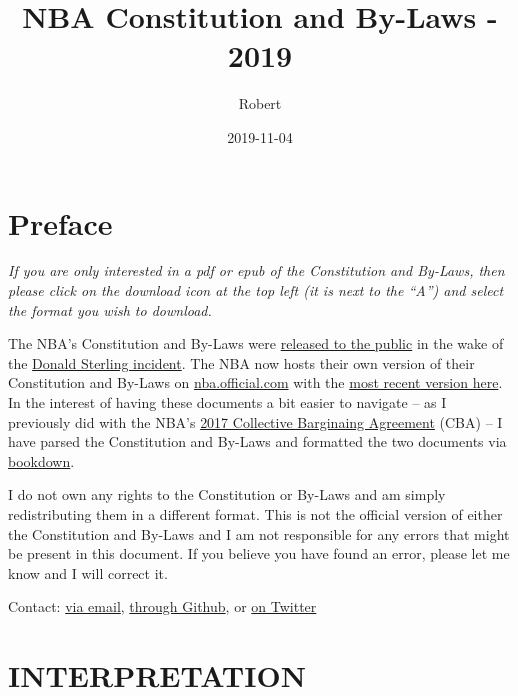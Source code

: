 \documentclass[]{book}
\title{NBA Constitution and By-Laws - 2019}
\author{Robert}
\date{2019-11-04}
\begin{document}
\maketitle

{
\setcounter{tocdepth}{1}
\tableofcontents
}
\hypertarget{preface}{%
\chapter*{Preface}\label{preface}}

\emph{If you are only interested in a pdf or epub of the Constitution and By-Laws, then please click on the download icon at the top left (it is next to the ``A'') and select the format you wish to download.}

The NBA's Constitution and By-Laws were \href{http://prawfsblawg.blogs.com/files/221035054-nba-constitution-and-by-laws.pdf}{released to the public} in the wake of the \href{https://deadspin.com/that-secret-nba-constitution-is-now-online-1569509012}{Donald Sterling incident}. The NBA now hosts their own version of their Constitution and By-Laws on \href{https://official.nba.com/}{nba.official.com} with the \href{https://ak-static.cms.nba.com/wp-content/uploads/sites/4/2019/09/NBA-Constitution-By-Laws-September-2019-1.pdf}{most recent version here}. In the interest of having these documents a bit easier to navigate -- as I previously did with the NBA's \href{https://atlhawksfanatic.github.io/NBA-CBA/}{2017 Collective Barginaing Agreement} (CBA) -- I have parsed the Constitution and By-Laws and formatted the two documents via \href{https://bookdown.org/yihui/bookdown/}{bookdown}.

I do not own any rights to the Constitution or By-Laws and am simply redistributing them in a different format. This is not the official version of either the Constitution and By-Laws and I am not responsible for any errors that might be present in this document. If you believe you have found an error, please let me know and I will correct it.

Contact: \href{atlhawksfanatic@gmail.com}{via email}, \href{https://github.com/atlhawksfanatic}{through Github}, or \href{https://twitter.com/atlhawksfanatic}{on Twitter}

\hypertarget{interpretation}{%
\chapter{INTERPRETATION}\label{interpretation}}
\end{document}
